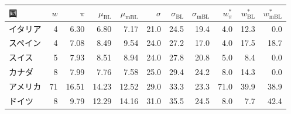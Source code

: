 \begin{tabular}{lrrrrrrrrrr}
\toprule
国 & $w$ & $\pi$ & $\mu_{\mathrm{BL}}$ & $\mu_{\mathrm{mBL}}$ & $\sigma$ & $\sigma_{\mathrm{BL}}$ & $\sigma_{\mathrm{mBL}}$ & $w^*_{\pi}$ & $w^*_{\mathrm{BL}}$ & $w^*_{\mathrm{mBL}}$ \\
\midrule
イタリア & 4 & 6.30 & 6.80 & 7.17 & 21.0 & 24.5 & 19.4 & 4.0 & 12.3 & 0.0 \\
スペイン & 4 & 7.08 & 8.49 & 9.54 & 24.0 & 27.2 & 17.0 & 4.0 & 17.5 & 18.7 \\
スイス & 5 & 7.93 & 8.51 & 8.94 & 24.0 & 27.8 & 20.8 & 5.0 & 8.4 & 0.0 \\
カナダ & 8 & 7.99 & 7.76 & 7.58 & 25.0 & 29.4 & 24.2 & 8.0 & 14.3 & 0.0 \\
アメリカ & 71 & 16.51 & 14.23 & 12.52 & 29.0 & 33.3 & 23.3 & 71.0 & 39.9 & 38.9 \\
ドイツ & 8 & 9.79 & 12.29 & 14.16 & 31.0 & 35.5 & 24.5 & 8.0 & 7.7 & 42.4 \\
\bottomrule
\end{tabular}
